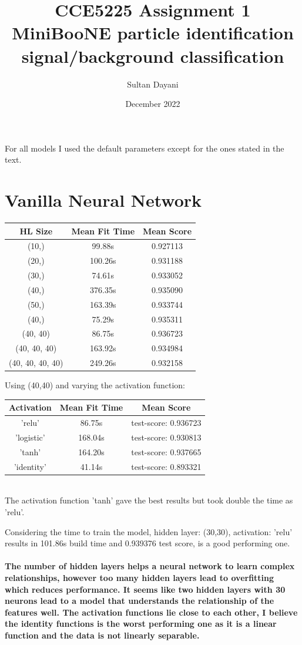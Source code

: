 \documentclass{article}
\title{CCE5225 \dashv{} Assignment 1 \\
\large MiniBooNE particle identification \\ signal/background classification}
\author{Sultan Dayani}
\date{December 2022}
\begin{document}
For all models I used the default parameters except for the ones stated in the text.
\section{Vanilla Neural Network}
\begin{tabular}{|c c c|}
	\hline  
	HL Size & Mean Fit Time & Mean Score \\ [0.5ex] 
	\hline
	(10,) & 99.88s & 0.927113   \\
	\hline
	(20,) & 100.26s & 0.931188   \\
	\hline
	(30,) & 74.61s & 0.933052   \\
	\hline
	(40,) & 376.35s & 0.935090   \\
	\hline
	(50,) & 163.39s & 0.933744   \\ 
  \hline
  (40,) & 75.29s & 0.935311 \\
  \hline
  (40, 40) & 86.75s & 0.936723 \\
  \hline
  (40, 40, 40) & 163.92s & 0.934984 \\
  \hline
  (40, 40, 40, 40) & 249.26s & 0.932158 \\
	\hline
\end{tabular}

Using (40,40) and varying the activation function: \\
\begin{tabular}{|c c c|}
	\hline  
	Activation & Mean Fit Time & Mean Score \\ [0.5ex] 
	\hline
  'relu' & 86.75s & test-score: 0.936723 \\ 
	\hline
  'logistic' & 168.04s & test-score: 0.930813 \\ 
	\hline
  'tanh' & 164.20s & test-score: 0.937665 \\ 
	\hline
  'identity' & 41.14s & test-score: 0.893321 \\ 
	\hline
\end{tabular} \\
The activation function 'tanh' gave the best results but took double the time as 'relu'.

Considering the time to train the model,
hidden layer: (30,30), activation: 'relu' results in 101.86s build time and 0.939376 test score, is a good performing one.

\paragraph[Comment]{
The number of hidden layers helps a neural network to learn complex relationships, however too many hidden layers lead to overfitting which reduces performance.
It seems like two hidden layers with 30 neurons lead to a model that understands the relationship of the features well.
The activation functions lie close to each other, I believe the identity functions is the worst performing one as it is a linear function and the data is not linearly separable.
}
\end{document}
